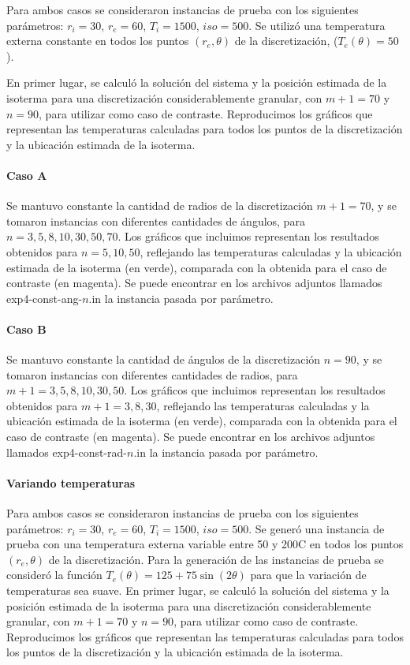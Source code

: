         Para ambos casos se consideraron instancias de prueba con los siguientes parámetros: $r_i = 30$, $r_e = 60$, $T_i = 1500$, $iso = 500$. Se utilizó una temperatura externa constante en todos los puntos $(r_e, \theta)$ de la discretización, ($T_e(\theta) = 50$). 

        En primer lugar, se calculó la solución del sistema y la posición estimada de la isoterma para una discretización considerablemente granular, con $m + 1 = 70$ y $n = 90$, para utilizar como caso de contraste. Reproducimos los gráficos que representan las temperaturas calculadas para todos los puntos de la discretización y la ubicación estimada de la isoterma. 

        \paragraph{Caso A} Se mantuvo constante la cantidad de radios de la discretización $m + 1 = 70$, y se tomaron instancias con diferentes cantidades de ángulos, para $n = 3, 5, 8, 10, 30, 50, 70$. Los gráficos que incluimos representan los resultados obtenidos para $n = 5, 10, 50$, reflejando las temperaturas calculadas y la ubicación estimada de la isoterma (en verde), comparada con la obtenida para el caso de contraste (en magenta). Se puede encontrar en los archivos adjuntos llamados exp4-const-ang-$n$.in  la instancia pasada por parámetro.

        \paragraph{Caso B} Se mantuvo constante la cantidad de ángulos de la discretización $n = 90$, y se tomaron instancias con diferentes cantidades de radios, para $m + 1 = 3, 5, 8, 10, 30, 50$. Los gráficos que incluimos representan los resultados obtenidos para $m + 1 = 3, 8, 30$, reflejando las temperaturas calculadas y la ubicación estimada de la isoterma (en verde), comparada con la obtenida para el caso de contraste (en magenta). Se puede encontrar en los archivos adjuntos llamados exp4-const-rad-$n$.in  la instancia pasada por parámetro.

      \paragraph{Variando temperaturas}

        Para ambos casos se consideraron instancias de prueba con los siguientes parámetros: $r_i = 30$, $r_e = 60$, $T_i = 1500$, $iso = 500$. Se generó una instancia de prueba con una temperatura externa variable entre 50 y 200{\degree}C en todos los puntos $(r_e, \theta)$ de la discretización. 
        Para la generación de las instancias de prueba se consideró la función $T_e(\theta) = 125 + 75 \sin(2\theta)$ para que la variación de temperaturas sea suave.
        En primer lugar, se calculó la solución del sistema y la posición estimada de la isoterma para una discretización considerablemente granular, con $m + 1 = 70$ y $n = 90$, para utilizar como caso de contraste. Reproducimos los gráficos que representan las temperaturas calculadas para todos los puntos de la discretización y la ubicación estimada de la isoterma.

